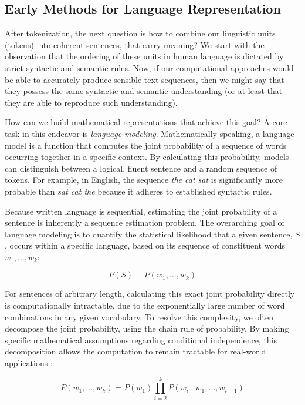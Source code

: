 \subsection{Early Methods for Language Representation}
\label{sec:early}
After tokenization, the next question is how to combine our linguistic units (tokens) into coherent sentences, that carry meaning? We start with the observation that the ordering of these units in human language is dictated by strict syntactic and semantic rules. Now, if our computational approaches would be able to accurately produce sensible text sequences, then we might say that they possess the same syntactic and semantic understanding (or at least that they are able to reproduce such understanding).

How can we build mathematical representations that achieve this goal? A core task in this endeavor is \emph{language modeling}. Mathematically speaking, a language model is a function  that computes the joint probability of a sequence of words occurring together in a specific context.
By calculating this probability, models can distinguish between a logical, fluent sentence and a random sequence of tokens. For example, in English, the sequence \textit{the cat sat} is significantly more probable than \textit{sat cat the} because it adheres to established syntactic rules.

Because written language is sequential, estimating the joint probability of a sentence is inherently a sequence estimation problem. The overarching goal of language modeling is to quantify the statistical likelihood that a given sentence, $S$, occurs within a specific language, based on its sequence of constituent words $w_1, \dots, w_k$:

\begin{equation}
    \label{eq:language-sequence}
    P(S) = P(w_1, \dots, w_k)
\end{equation}

For sentences of arbitrary length, calculating this exact joint probability directly is computationally intractable, due to the exponentially large  number of word combinations in any given vocabulary. To resolve this complexity, we often decompose the joint probability, using the chain rule of probability. By making specific mathematical assumptions regarding conditional independence, this decomposition allows the computation to remain tractable for real-world applications \citep{jm3}:

\begin{equation}
\label{eq:bigram}
    P(w_1, \dots, w_k) = P(w_1) \prod_{i=2}^{k} P(w_i \mid w_1, \dots, w_{i-1})
\end{equation}

